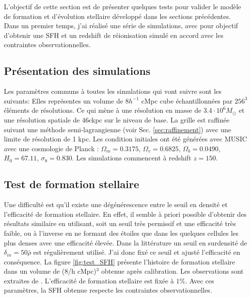 L'objectif de cette section est de présenter quelques tests pour valider le modèle de formation et d'évolution stellaire développé dans les sections précédentes.
Dans un premier temps, j'ai réalisé une série de simulations, avec pour objectif d'obtenir une \ac{SFH} et un redshift de réionisation simulé en accord avec les contraintes observationnelles.

\subsection{Présentation des simulations}
\label{sec:pres_simu}

Les paramètres communs à toutes les simulations qui vont suivre sont les suivants:
Elles représentes un volume de $8h^{-1}$ cMpc cube échantillonnées par $256^3$ éléments de résolutions. %
Ce qui mène à une résolution en masse de $3.4 \cdot 10^6 M_\odot$ et une résolution spatiale de $46$ckpc sur le niveau de base.
La grille est raffinée suivant une méthode semi-lagrangienne (voir Sec. \ref{sec:raffinement}) avec une limite de résolution de 1 kpc.
Les condition initiales ont été générées avec MUSIC \citep{hahn_multi-scale_2011} avec une cosmologie de Planck \citep{planck_collaboration_planck_2016} : 
$\Omega_m=0.3175$, 
$\Omega_v=0.6825$,
$\Omega_b=0.0490$,
$H_0=67.11$,
$\sigma_8=0.830$. 
Les simulations commencent à redshift $z=150$.


\subsection{Test de formation stellaire}

Une difficulté est qu'il existe une dégénérescence entre le seuil en densité et l'efficacité de formation stellaire.
En effet, il semble à priori possible d'obtenir des résultats similaire en utilisant, soit un seuil très permissif et une efficacité très faible, ou à l'inverse en ne formant des étoiles que dans les quelques cellules les plus denses avec une efficacité élevée.
Dans la littérature %
un seuil en surdensité de $\delta_{in}=50\bar{\rho}$ est régulièrement utilisé.
J'ai donc fixé ce seuil et ajusté l'efficacité en conséquence.
La figure \ref{fig:test_SFH} présente l'histoire de formation stellaire dans un volume de (8/h cMpc)$^3$ obtenue après calibration. 
Les observations sont extraites de \cite{bouwens_reionization_2015}.
L'efficacité de formation stellaire est fixée à $1\%$.
Avec ces paramètres, la \ac{SFH} obtenue respecte les contraintes observationnelles.

